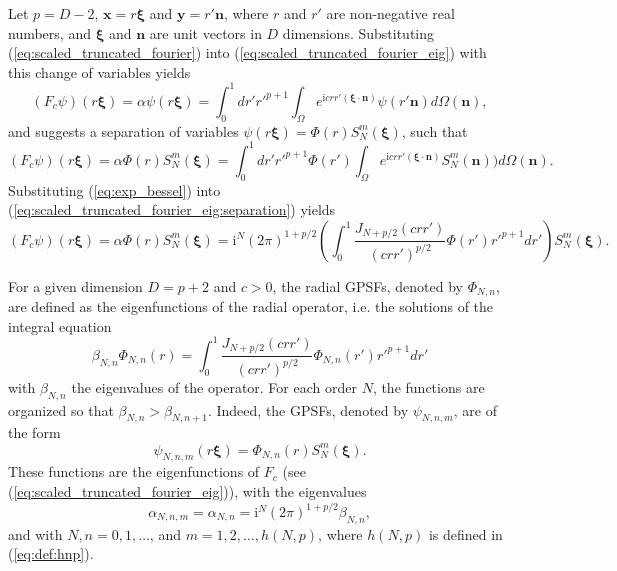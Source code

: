 \documentclass[12pt]{article}
\begin{document}
Let $p=D-2$, ${\bm x}= r {\bm \xi}$ and ${\bm y}= r'{\bm n}$, where $r$ and $r'$ are non-negative real numbers, and ${\bm \xi}$ and ${\bm n}$ are unit vectors in $D$ dimensions. Substituting  (\ref{eq:scaled_truncated_fourier}) into (\ref{eq:scaled_truncated_fourier_eig}) with this change of variables yields
\begin{equation}
 \left( {F}_c \psi\right)(r {\bm \xi}) = \alpha \psi(r {\bm \xi})  = \int_0^1 dr' r'^{p+1} \int_\Omega e^{ \mathrm{i} c r r' \left( {\bm{\xi}} \cdot {\bm{n}} \right) } \psi(r' \bm{n})  {d}\Omega(\bm{n}) ,
\end{equation}
and suggests a separation of variables $\psi(r {\bm \xi}) = \Phi(r) S_N^m({\bm \xi})$, such that 
\begin{equation}\label{eq:scaled_truncated_fourier_eig:separation}
 \left( {F}_c \psi\right)(r {\bm \xi}) = \alpha \Phi(r) S_N^m({\bm \xi})  = \int_0^1 dr' r'^{p+1} \Phi(r')  \int_\Omega e^{ \mathrm{i} c r r' \left( {\bm{\xi}} \cdot {\bm{n}} \right) } S_N^m({\bm n}))  {d}\Omega(\bm{n}) .
\end{equation}
Substituting (\ref{eq:exp_bessel}) into (\ref{eq:scaled_truncated_fourier_eig:separation}) yields
\begin{equation}
 \left( {F}_c \psi\right)(r {\bm \xi}) = \alpha \Phi(r) S_N^m({\bm \xi})  = \mathrm{i}^N (2 \pi)^{1+p/2}  \left( \int_0^1 \frac{J_{N+p/2}(crr')}{(crr')^{p/2}} \Phi(r') r'^{p+1} dr' \right) S_N^m({\bm \xi}).
\end{equation}



For a given dimension $D=p+2$ and $c>0$, the radial GPSFs, denoted by $\Phi_{N,n}$, are defined as the eigenfunctions of the radial operator, i.e. the solutions of the integral equation
\begin{equation}\label{eq:def:radial_prol}
  \beta_{N,n} \Phi_{N,n}(r) = \int_0^1 \frac{J_{N+p/2}(crr')}{(crr')^{p/2}} \Phi_{N,n}(r') r'^{p+1} dr' 
\end{equation}
with $\beta_{N,n}$ the eigenvalues of the operator. For each order $N$, the functions are organized so that $\beta_{N,n}>\beta_{N,n+1}$.
Indeed, the GPSFs, denoted by $\psi_{N,n,m}$, are of the form
\begin{equation}\label{eq:def:prol}
  \psi_{N,n,m}(r {\bm \xi}) = \Phi_{N,n}(r) S_N^m({\bm \xi}).
\end{equation}
These functions are the eigenfunctions of $F_c$ (see (\ref{eq:scaled_truncated_fourier_eig})), with the eigenvalues
\begin{equation}\label{eq:alpha}
  \alpha_{N,n,m} = \alpha_{N,n} = \mathrm{i}^N (2 \pi)^{1+p/2} \beta_{N,n},
\end{equation}
and with $N,n = 0,1,\ldots$, and $m=1,2,\ldots,h(N,p)$, where $h(N,p)$ is defined in (\ref{eq:def:hnp}). 
\end{document}
